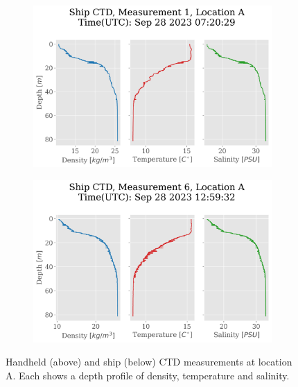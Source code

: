 \documentclass[a4paper,10pt,english]{article}
\begin{document}
\begin{figure}[H]
\begin{adjustwidth}{-2.5cm}{-2.5cm}
    \begin{subfigure}{0.65\textwidth}
            \centering
            \includegraphics[width=.9\linewidth]{../figures/ship_ctd/ship_ctd_Measurement_1_Location_A.png}
            \caption{}
            \label{fig:ship_m1lA}
    \end{subfigure}%
    \begin{subfigure}{0.65\textwidth}
            \centering
            \includegraphics[width=.9\linewidth]{../figures/ship_ctd/ship_ctd_Measurement_6_Location_A.png}
            \caption{}
            \label{fig:ship_m6lA}
    \end{subfigure}
    \end{adjustwidth}
    
    \caption{Handheld (above) and ship (below) CTD measurements at location A. Each shows a depth profile of density, temperature and salinity.}
    \label{fig:location_Aapp}
    \end{figure}
    
\end{document}
